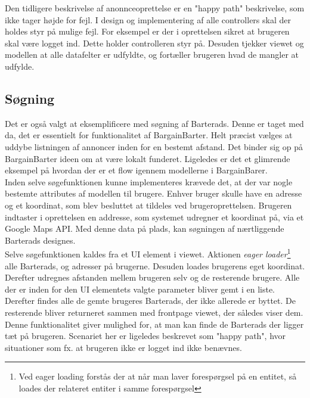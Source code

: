 \noindent Den tidligere beskrivelse af anonnceoprettelse er en "happy path" beskrivelse, som ikke tager højde for fejl. I design og implementering af alle controllers skal der holdes styr på mulige fejl. For eksempel er der i oprettelsen sikret at brugeren skal være logget ind. Dette holder controlleren styr på. Desuden tjekker viewet og modellen at alle datafelter er udfyldte, og fortæller brugeren hvad de mangler at udfylde.

\subsection{Søgning}     
Det er også valgt at eksemplificere med søgning af Barterads. Denne er taget med da, det er essentielt for funktionalitet af BargainBarter. Helt præcist vælges at uddybe listningen af annoncer inden for en bestemt afstand. Det binder sig op på BargainBarter ideen om at være lokalt funderet. Ligeledes er det et glimrende eksempel på hvordan der er et flow igennem modellerne i BargainBarer. \\

\noindent Inden selve søgefunktionen kunne implementeres krævede det, at der var nogle bestemte attributes af modellen til brugere. Enhver bruger skulle have en adresse og et koordinat, som blev besluttet at tildeles ved brugeroprettelsen. Brugeren indtaster i oprettelsen en addresse, som systemet udregner et koordinat på, via et Google Maps API. Med denne data på plads, kan søgningen af nærtliggende Barterads designes.\\

\noindent Selve søgefunktionen kaldes fra et UI element i viewet. Aktionen \textit{eager loader}\footnote{Ved eager loading forstås der at når man laver forespørgsel på en entitet, så loades der relateret entiter i samme forespørgsel} alle Barterads, og adresser på brugerne. Desuden loades brugerens eget koordinat. Derefter udregnes afstanden mellem brugeren selv og de resterende brugere. Alle der er inden for den UI elementets valgte parameter bliver gemt i en liste. Derefter findes alle de gemte brugeres Barterads, der ikke allerede er byttet. De resterende bliver returneret sammen med frontpage viewet, der således viser dem. Denne funktionalitet giver mulighed for, at man kan finde de Barterads der ligger tæt på brugeren. Scenariet her er ligeledes beskrevet som "happy path", hvor situationer som fx. at brugeren ikke er logget ind ikke benævnes.


